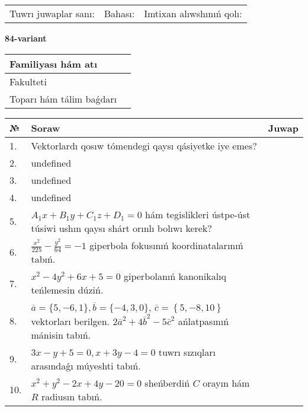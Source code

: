 \documentclass{article}
\begin{document}
\vspace{0.7cm}

\begin{tabular}{lll}
Tuwrı juwaplar sanı: \underline{\hspace{1cm}} & 
Bahası: \underline{\hspace{1cm}} & 
Imtixan alıwshınıń qolı: \underline{\hspace{2cm}} \\
\end{tabular}

\egroup

\newpage


\textbf{84-variant}\\

\bgroup
\def\arraystretch{1.6} %

\begin{tabular}{|m{5.7cm}|m{9.5cm}|}
\hline
Familiyası hám atı & \\
\hline
Fakulteti  & \\
\hline
Toparı hám tálim baǵdarı  & \\
\hline
\end{tabular}

\vspace{0.7cm}

\begin{tabular}{|m{0.7cm}|m{10cm}|m{4cm}|}
\hline
№ & Soraw & Juwap \\
\hline
1. & Vektorlardı qosıw tómendegi qaysı qásiyetke iye emes? &  \\
\hline
2. & undefined &  \\
\hline
3. & undefined &  \\
\hline
4. & undefined &  \\
\hline
5. & \(A_{1}x + B_{1}y + C_{1}z + D_{1} = 0\) hám tegislikleri ústpe-úst túsiwi ushın qaysı shárt orınlı bolıwı kerek? &  \\
\hline
6. & \(\frac{x^{2}}{225} - \frac{y^{2}}{64} = - 1\) giperbola fokusınıń koordinatalarınıń tabıń. &  \\
\hline
7. & \(x^{2} - 4 y^{2} + 6 x + 5 = 0\) giperbolanıń kanonikalıq teńlemesin dúziń. &  \\
\hline
8. & \(\overline{a} = \{5,- 6, 1 \}, \overline{b} = \{ - 4, 3, 0 \} \), \(\overline{c} = \left\{ 5,- 8, 10 \right\}\) vektorları berilgen. \(2{\bar{a}}^{2} + 4{\bar{b}}^{2} - 5{\bar{c}}^{2}\) ańlatpasınıń mánisin tabıń. &  \\
\hline
9. & \(3 x - y + 5 = 0, x + 3 y - 4 = 0\) tuwrı sızıqları arasındaǵı múyeshti tabıń. &  \\
\hline
10. & \(x^{2} + y^{2} - 2 x + 4 y - 20 = 0\) sheńberdiń \(C\) orayın hám \(R\) radiusın tabıń. & \\
\hline
\end{tabular}
\end{document}
